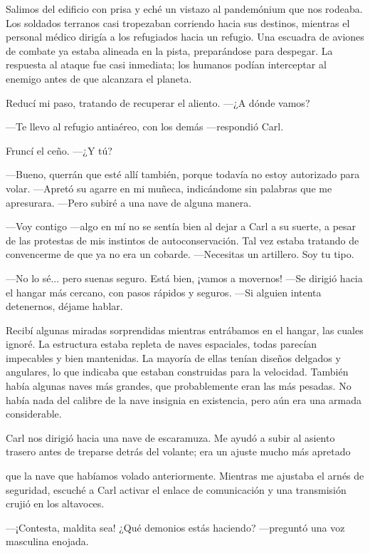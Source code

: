 \documentclass[spanish,12pt,a4paper,oneside,titlepage]{book}
\begin{document}
    Salimos del edificio con prisa y eché un vistazo al pandemónium que nos rodeaba. Los soldados terranos casi tropezaban corriendo hacia sus destinos, mientras el personal médico dirigía a los refugiados hacia un refugio. Una escuadra de aviones de combate ya estaba alineada en la pista, preparándose para despegar. La respuesta al ataque fue casi inmediata; los humanos podían interceptar al enemigo antes de que alcanzara el planeta.

    Reducí mi paso, tratando de recuperar el aliento. —¿A dónde vamos?

    —Te llevo al refugio antiaéreo, con los demás —respondió Carl.

    Fruncí el ceño. —¿Y tú?

    —Bueno, querrán que esté allí también, porque todavía no estoy autorizado para volar. —Apretó su agarre en mi muñeca, indicándome sin palabras que me apresurara. —Pero subiré a una nave de alguna manera.

    —Voy contigo —algo en mí no se sentía bien al dejar a Carl a su suerte, a pesar de las protestas de mis instintos de autoconservación. Tal vez estaba tratando de convencerme de que ya no era un cobarde. —Necesitas un artillero. Soy tu tipo.

    —No lo sé... pero suenas seguro. Está bien, ¡vamos a movernos! —Se dirigió hacia el hangar más cercano, con pasos rápidos y seguros. —Si alguien intenta detenernos, déjame hablar.

    Recibí algunas miradas sorprendidas mientras entrábamos en el hangar, las cuales ignoré. La estructura estaba repleta de naves espaciales, todas parecían impecables y bien mantenidas. La mayoría de ellas tenían diseños delgados y angulares, lo que indicaba que estaban construidas para la velocidad. También había algunas naves más grandes, que probablemente eran las más pesadas. No había nada del calibre de la nave insignia en existencia, pero aún era una armada considerable.

    Carl nos dirigió hacia una nave de escaramuza. Me ayudó a subir al asiento trasero antes de treparse detrás del volante; era un ajuste mucho más apretado

    que la nave que habíamos volado anteriormente. Mientras me ajustaba el arnés de seguridad, escuché a Carl activar el enlace de comunicación y una transmisión crujió en los altavoces.

    —¡Contesta, maldita sea! ¿Qué demonios estás haciendo? —preguntó una voz masculina enojada.
\end{document}

